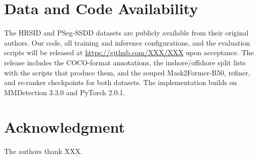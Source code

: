 \section*{Data and Code Availability}
The HRSID and PSeg-SSDD datasets are publicly available from their original authors. Our code, all training and inference configurations, and the evaluation scripts will be released at \url{https://github.com/XXX/XXX} upon acceptance. The release includes the COCO-format annotations, the inshore/offshore split lists with the scripts that produce them, and the souped Mask2Former-R50, refiner, and re-ranker checkpoints for both datasets. The implementation builds on MMDetection 3.3.0 and PyTorch 2.0.1.

\section*{Acknowledgment}
The authors thank XXX.
